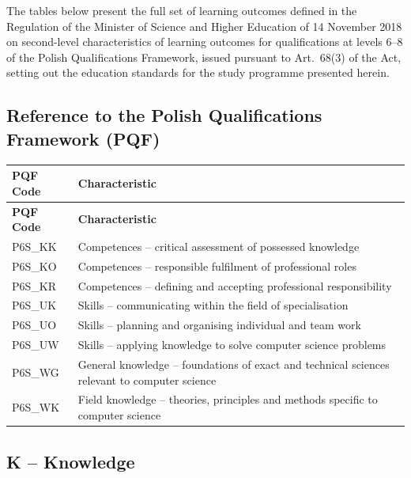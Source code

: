 \documentclass[12pt,a4paper]{article}
\newcommand{\thdrule}{\noalign{\global\setlength{\extrarowheight}{0pt}}}
\newcommand{\thdend}{\noalign{\global\setlength{\extrarowheight}{4pt}}}
\begin{document}
The tables below present the full set of learning outcomes defined in the Regulation of the Minister of Science and Higher Education of 14 November 2018 on second-level characteristics of learning outcomes for qualifications at levels 6--8 of the Polish Qualifications Framework, issued pursuant to Art.~68(3) of the Act, setting out the education standards for the study programme presented herein.

\subsection*{Reference to the Polish Qualifications Framework (PQF)}

{\scriptsize
\begin{longtable}{m{2.8cm}m{12cm}}
\thdrule\toprule
\rowcolor{pjatkRed} {\color{white}\footnotesize\textbf{\vphantom{Ag}PQF Code}} & {\color{white}\footnotesize\textbf{\vphantom{Ag}Characteristic}} \\
\midrule\thdend
\endfirsthead
\thdrule\toprule
\rowcolor{pjatkRed} {\color{white}\footnotesize\textbf{\vphantom{Ag}PQF Code}} & {\color{white}\footnotesize\textbf{\vphantom{Ag}Characteristic}} \\
\midrule\thdend
\endhead
\rowcolor{tableRowLight} P6S\_KK & Competences -- critical assessment of possessed knowledge \\
\rowcolor{tableRowAlt} P6S\_KO & Competences -- responsible fulfilment of professional roles \\
\rowcolor{tableRowLight} P6S\_KR & Competences -- defining and accepting professional responsibility \\
\rowcolor{tableRowAlt} P6S\_UK & Skills -- communicating within the field of specialisation \\
\rowcolor{tableRowLight} P6S\_UO & Skills -- planning and organising individual and team work \\
\rowcolor{tableRowAlt} P6S\_UW & Skills -- applying knowledge to solve computer science problems \\
\rowcolor{tableRowLight} P6S\_WG & General knowledge -- foundations of exact and technical sciences relevant to computer science \\
\rowcolor{tableRowAlt} P6S\_WK & Field knowledge -- theories, principles and methods specific to computer science \\
\bottomrule
\end{longtable}}

\bigskip
\subsection*{K -- Knowledge}
\end{document}
